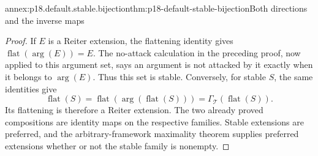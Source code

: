 \begin{annexitem}{annex:p18.default.stable.bijection}{thm:p18-default-stable-bijection}{Both directions and the inverse maps}
\begin{proof}
If \(E\) is a Reiter extension,
the flattening identity gives
\(\operatorname{flat}(\operatorname{arg}(E))=E\).
The no-attack calculation in
the preceding proof, now applied
to this argument set, says an
argument is not attacked by it
exactly when it belongs to
\(\operatorname{arg}(E)\).
Thus this set is stable.
Conversely, for stable \(S\),
the same identities give
\[
 \operatorname{flat}(S)
 =\operatorname{flat}(\operatorname{arg}(\operatorname{flat}(S)))
 =\Gamma_{\mathcal T}(\operatorname{flat}(S)).
\]
Its flattening is therefore
a Reiter extension. The two
already proved compositions
are identity maps on the
respective families.
Stable extensions are preferred,
and the arbitrary-framework
maximality theorem supplies
preferred extensions whether
or not the stable family
is nonempty.
\end{proof}
\end{annexitem}

